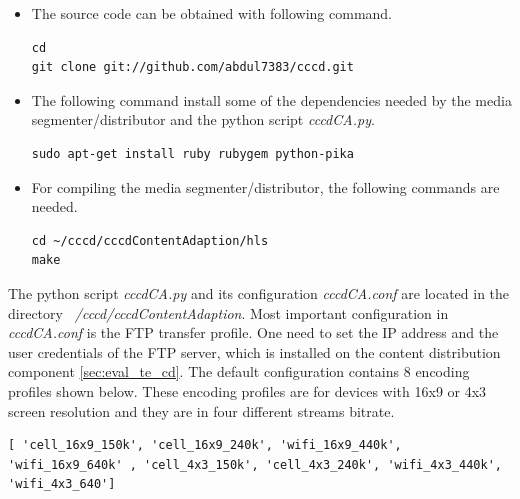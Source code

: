 \begin{itemize}

\item The source code can be obtained with following command.

\begin{code}
\begin{verbatim}
cd
git clone git://github.com/abdul7383/cccd.git
\end{verbatim}
\end{code}

\item The following command install some of the dependencies needed by the media segmenter/distributor and the python script \textit{cccdCA.py}.

\begin{code}
\begin{verbatim}
sudo apt-get install ruby rubygem python-pika
\end{verbatim}
\end{code}

\item For compiling the media segmenter/distributor, the following commands are needed.

\begin{code}
\begin{verbatim}
cd ~/cccd/cccdContentAdaption/hls
make
\end{verbatim}
\end{code}

\end{itemize} 

The python script \textit{cccdCA.py} and its configuration \textit{cccdCA.conf} are located in the directory \textit{~/cccd/cccdContentAdaption}. Most important configuration in \textit{ cccdCA.conf}  is the FTP transfer profile. One need to set the IP address and the user credentials of the FTP server, which is installed on the content distribution component \ref{sec:eval_te_cd}. The default configuration contains 8 encoding profiles shown below. These encoding profiles are for devices with 16x9 or 4x3 screen resolution and they are in four different streams bitrate.

\begin{code}
\begin{verbatim}
[ 'cell_16x9_150k', 'cell_16x9_240k', 'wifi_16x9_440k', 'wifi_16x9_640k' , 'cell_4x3_150k', 'cell_4x3_240k', 'wifi_4x3_440k', 'wifi_4x3_640']
\end{verbatim}
\label{lst:encoding_profiles}
\end{code}

